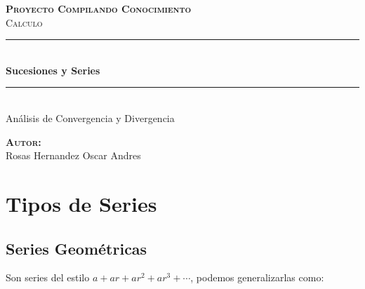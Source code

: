 \documentclass[12pt]{report}							    %
\author{Oscar Andrés Rosas}						            %
\begin{document}
\begin{titlepage}

	\center
	\textbf{\textsc{\Large Proyecto Compilando Conocimiento}}\\[1.0cm] 
	\textsc{\Large Calculo}\\[1.0cm] 

	\rule{\linewidth}{0.5mm} \\[1.0cm]
		{ \huge \bfseries Sucesiones y Series}\\[1.0cm] 
	\rule{\linewidth}{0.5mm} \\[2.0cm]
	
	{\LARGE Análisis de Convergencia y Divergencia}\\[7cm] 
	
	\begin{center} \large
	\textbf{\textsc{Autor:}}\\
	Rosas Hernandez Oscar Andres
	\end{center}

	\vfill

\end{titlepage}

\tableofcontents{}
\clearpage

\chapter{Tipos de Series}
    \clearpage

    \section{Series Geométricas}
        Son series del estilo $a + ar + ar^2 + ar^3 + \cdots$, podemos
        generalizarlas como:
\end{document}
